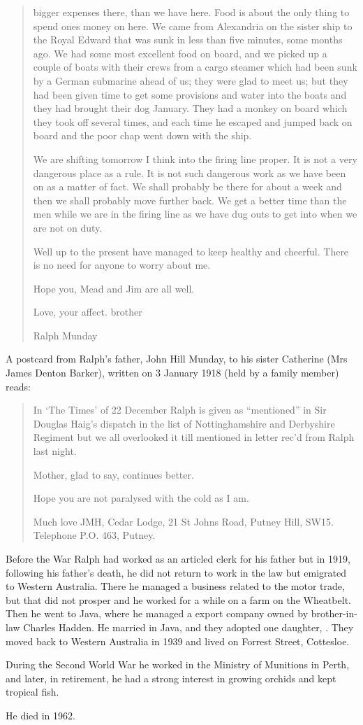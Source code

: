 \begin{quotation}
bigger expenses there, than we have here. Food is about the only thing to spend ones money on here. We came from Alexandria on the sister ship to the Royal Edward that was sunk in less than five minutes, some months ago. We had some most excellent food on board, and we picked up a couple of boats with their crews from a cargo steamer which had been sunk by a German submarine ahead of us; they were glad to meet us; but they had been given time to get some provisions and water into the boats and they had brought their dog January. They had a monkey on board which they took off several times, and each time he escaped and jumped back on board and the poor chap went down with the ship.

We are shifting tomorrow I think into the firing line proper. It is not a very dangerous place as a rule. It is not such dangerous work as we have been on as a matter of fact. We shall probably be there for about a week and then we shall probably move further back. We get a better time than the men while we are in the firing line as we have dug outs to get into when we are not on duty.

Well up to the present have managed to keep healthy and cheerful. There is no need for anyone to worry about me.

Hope you, Mead and Jim are all well.

Love, your affect. brother

Ralph Munday
\end{quotation}

A postcard from Ralph's father, John Hill Munday, to his sister Catherine (Mrs James Denton Barker), written on 3 January 1918 (held by a family member) reads:

\begin{quotation}
In `The Times' of 22 December Ralph is given as ``mentioned'' in Sir Douglas Haig's dispatch in the list of Nottinghamshire and Derbyshire Regiment but we all overlooked it till mentioned in letter rec'd from Ralph last night.

Mother, glad to say, continues better.

Hope you are not paralysed with the cold as I am.

Much love JMH, Cedar Lodge, 21 St Johns Road, Putney Hill, SW15.
Telephone P.O. 463, Putney.
\end{quotation}

Before the War Ralph had worked as an articled clerk for his father but in 1919, following his father's death, he did not return to work in the law but emigrated to Western Australia.  There he managed a business related to the motor trade, but that did not prosper and he worked for a while on a farm on the Wheatbelt. Then he went to Java,  where he managed a export company owned by brother-in-law Charles Hadden.  He married  in Java,\cite{LadiesSection} and they adopted one daughter, .
They moved back to Western Australia in 1939 and lived on Forrest Street, Cottesloe.

During the Second World War he worked in the Ministry of Munitions in Perth, and later, in retirement, he had a strong interest in growing orchids and kept tropical fish.

He died in 1962.\cite{RalphMundayBMD}
